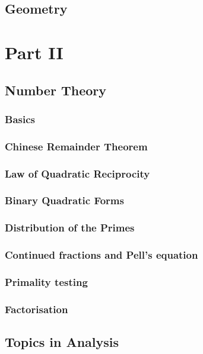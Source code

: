 \documentclass[12pt]{book}
\theoremstyle{definition}
\theoremstyle{remark}
\begin{document}
	\chapter{Geometry}
		
	
	\part{Part II}
	\chapter{Number Theory}
		\section{Basics}
		
		\section{Chinese Remainder Theorem}
		
		\section{Law of Quadratic Reciprocity}
		
		\section{Binary Quadratic Forms}
		
		\section{Distribution of the Primes}
		
		\section{Continued fractions and Pell's equation}
		
		\section{Primality testing}
		
		\section{Factorisation}
	\chapter{Topics in Analysis}
	
\end{document}
